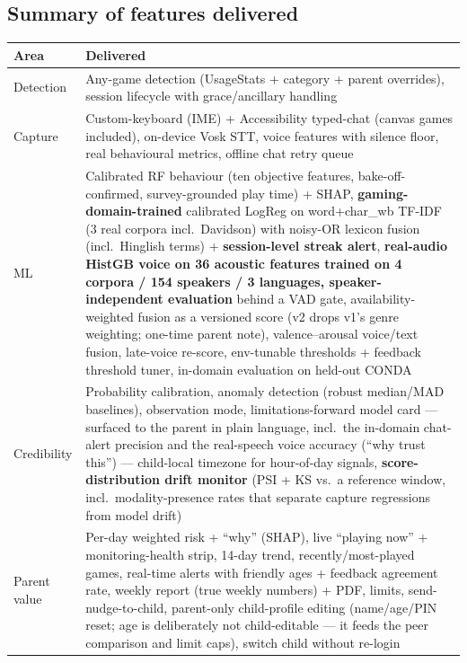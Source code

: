\documentclass[11pt,a4paper]{article}
\begin{document}
\subsection{Summary of features delivered}
\begin{center}
\footnotesize
\begin{tabularx}{\linewidth}{lX}
\toprule
\textbf{Area} & \textbf{Delivered} \\
\midrule
Detection & Any-game detection (UsageStats + category + parent overrides), session lifecycle with grace/ancillary handling \\
Capture & Custom-keyboard (IME) + Accessibility typed-chat (canvas games included), on-device Vosk STT, voice features with silence floor, real behavioural metrics, offline chat retry queue \\
ML & Calibrated RF behaviour (ten objective features, bake-off-confirmed, survey-grounded play time) + SHAP, \textbf{gaming-domain-trained} calibrated LogReg on word+char\_wb TF-IDF (3 real corpora incl.\ Davidson) with noisy-OR lexicon fusion (incl.\ Hinglish terms) + \textbf{session-level streak alert}, \textbf{real-audio HistGB voice on 36 acoustic features trained on 4 corpora / 154 speakers / 3 languages, speaker-independent evaluation} behind a VAD gate, availability-weighted fusion as a versioned score (v2 drops v1's genre weighting; one-time parent note), valence--arousal voice/text fusion, late-voice re-score, env-tunable thresholds + feedback threshold tuner, in-domain evaluation on held-out CONDA \\
Credibility & Probability calibration, anomaly detection (robust median/MAD baselines), observation mode, limitations-forward model card --- surfaced to the parent in plain language, incl.\ the in-domain chat-alert precision and the real-speech voice accuracy (``why trust this'') --- child-local timezone for hour-of-day signals, \textbf{score-distribution drift monitor} (PSI + KS vs.\ a reference window, incl.\ modality-presence rates that separate capture regressions from model drift) \\
Parent value & Per-day weighted risk + ``why'' (SHAP), live ``playing now'' + monitoring-health strip, 14-day trend, recently/most-played games, real-time alerts with friendly ages + feedback agreement rate, weekly report (true weekly numbers) + PDF, limits, send-nudge-to-child, parent-only child-profile editing (name/age/PIN reset; age is deliberately not child-editable --- it feeds the peer comparison and limit caps), switch child without re-login \\

\end{tabularx}
\end{center}
\end{document}
